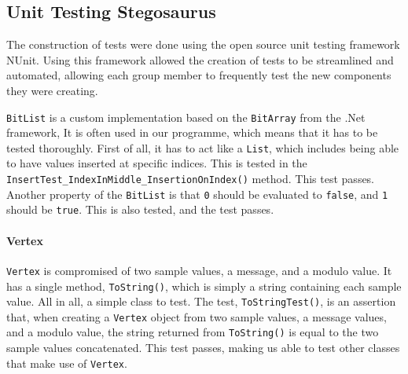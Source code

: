 \subsection{Unit Testing Stegosaurus}
The construction of tests were done using the open source unit testing framework NUnit.
Using this framework allowed the creation of tests to be streamlined and automated, allowing each group member to frequently test the new components they were creating.

\lstinline|BitList| is a custom implementation based on the \lstinline|BitArray| from the .Net framework, 
It is often used in our programme, which means that it has to be tested thoroughly.
First of all, it has to act like a \lstinline|List|, which includes being able to have values inserted at specific indices.
This is tested in the \lstinline|InsertTest_IndexInMiddle_InsertionOnIndex()| method.
This test passes.\\
Another property of the \lstinline|BitList| is that \lstinline|0| should be evaluated to \lstinline|false|, and \lstinline|1| should be \lstinline|true|.
This is also tested, and the test passes.

\paragraph*{Vertex}
\lstinline|Vertex| is compromised of two sample values, a message, and a modulo value.
It has a single method, \lstinline|ToString()|, which is simply a string containing each sample value.
All in all, a simple class to test.
The test, \lstinline|ToStringTest()|, is an assertion that, when creating a \lstinline|Vertex| object from two sample values, a message values, and a modulo value, the string returned from \lstinline|ToString()| is equal to the two sample values concatenated.
This test passes, making us able to test other classes that make use of \lstinline|Vertex|.

